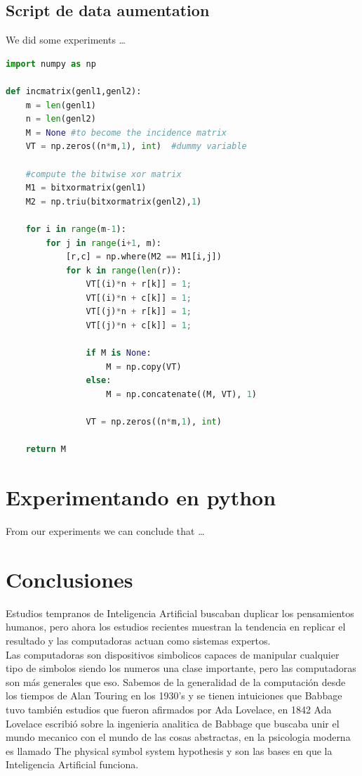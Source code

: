 \documentclass[a4paper, 11pt]{article}
\begin{document}
\subsection{Script de data aumentation}

We did some experiments \ldots

\begin{lstlisting}[language=Python, caption=Python example]
import numpy as np
    
def incmatrix(genl1,genl2):
    m = len(genl1)
    n = len(genl2)
    M = None #to become the incidence matrix
    VT = np.zeros((n*m,1), int)  #dummy variable
    
    #compute the bitwise xor matrix
    M1 = bitxormatrix(genl1)
    M2 = np.triu(bitxormatrix(genl2),1) 

    for i in range(m-1):
        for j in range(i+1, m):
            [r,c] = np.where(M2 == M1[i,j])
            for k in range(len(r)):
                VT[(i)*n + r[k]] = 1;
                VT[(i)*n + c[k]] = 1;
                VT[(j)*n + r[k]] = 1;
                VT[(j)*n + c[k]] = 1;
                
                if M is None:
                    M = np.copy(VT)
                else:
                    M = np.concatenate((M, VT), 1)
                
                VT = np.zeros((n*m,1), int)
    
    return M
\end{lstlisting}

\pagebreak

\section{Experimentando en python}

From our experiments we can conclude that \ldots

\pagebreak

\section{Conclusiones}

Estudios tempranos de Inteligencia Artificial buscaban duplicar los pensamientos humanos, pero ahora los estudios recientes muestran la tendencia en replicar el resultado y las computadoras actuan como sistemas expertos.\\

Las computadoras son dispositivos simbolicos capaces de manipular cualquier tipo de simbolos siendo los numeros una clase importante, pero las computadoras son más generales que eso. Sabemos de la generalidad de la computación desde los tiempos de Alan Touring en los 1930's y se tienen intuiciones que Babbage tuvo también estudios que fueron afirmados por Ada Lovelace, en 1842 Ada Lovelace escribió sobre la ingenieria analitica de Babbage que buscaba unir el mundo mecanico con el mundo de las cosas abstractas, en la psicologia moderna es llamado The physical symbol system hypothesis y son las bases en que la Inteligencia Artificial funciona.\\
\end{document}
